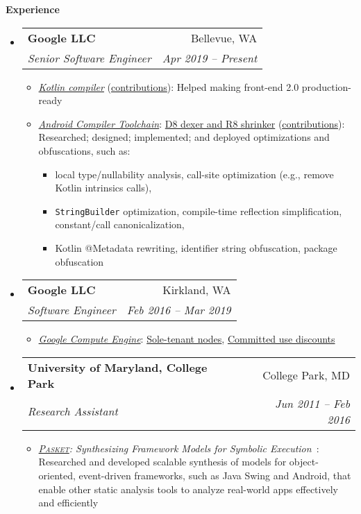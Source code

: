 \documentclass[letterpaper,11pt]{article}
\makeatletter
\newcommand{\resheading}[1]{{\large \colorbox{mygrey}{\begin{minipage}{\textwidth}{\textbf{#1 \vphantom{p\^{E}}}}\end{minipage}}}}
\newcommand{\ressubheading}[4]{
\begin{tabular*}{6.5in}{l@{\extracolsep{\fill}}r}
    \textbf{#1} & #2 \\
    \textit{#3} & \textit{#4} \\
\end{tabular*}\vspace{-6pt}}
\makeatother
\begin{document}
\resheading{Experience}
  \begin{itemize}
    \item
      \ressubheading{{Google LLC}}{Bellevue, WA}{Senior Software Engineer}{Apr 2019 -- Present}
        {
\small
        \begin{itemize}
\item\emph{\href{https://github.com/JetBrains/kotlin}{Kotlin compiler}} (\href{https://github.com/JetBrains/kotlin/commits?author=jsjeon}{\underline{contributions}}):
Helped making front-end 2.0 production-ready
\item\emph{\href{https://developer.android.com/studio/preview/index.html}{Android Compiler Toolchain}}:
\href{https://r8.googlesource.com/r8}{D8 dexer and R8 shrinker} (\href{https://r8-review.googlesource.com/q/author:jsjeon+status:merged}{\underline{contributions}}):
Researched; designed; implemented; and deployed optimizations and obfuscations, such as:
\begin{itemize}
\item local type/nullability analysis, call-site optimization (e.g., remove Kotlin intrinsics calls),
\item \texttt{StringBuilder} optimization, compile-time reflection simplification, constant/call canonicalization,
\item Kotlin @Metadata rewriting, identifier string obfuscation, package obfuscation
\end{itemize}
        \end{itemize}
        }
    \item
      \ressubheading{{Google LLC}}{Kirkland, WA}{Software Engineer}{Feb 2016 -- Mar 2019}
        {
\small
        \begin{itemize}
\item\emph{\href{https://cloud.google.com/compute/}{Google Compute Engine}}:
\href{https://cloudplatform.googleblog.com/2018/06/Introducing-sole-tenant-nodes-for-Google-Compute-Engine.html}{Sole-tenant nodes},
\href{https://cloudplatform.googleblog.com/2017/09/committed-use-discounts-for-Google-Compute-Engine-now-generally-available.html}{Committed use discounts}
        \end{itemize}
        }
    \item
      \ressubheading{{University of Maryland, College Park}}{College Park, MD}{Research Assistant}{Jun 2011 -- Feb 2016}
        {
\small
        \begin{itemize}
\item\emph{\href{https://github.com/plum-umd/pasket}{\textsc{Pasket}}: Synthesizing Framework Models for Symbolic Execution}~\cite{FMSD17, icse16, fse15, cav15, popl14, jsk-tr}:
Researched and developed scalable synthesis of models for object-oriented,
event-driven frameworks, such as Java Swing and Android,
that enable other static analysis tools
to analyze real-world apps effectively and efficiently


\end{itemize}}
\end{itemize}
\end{document}
